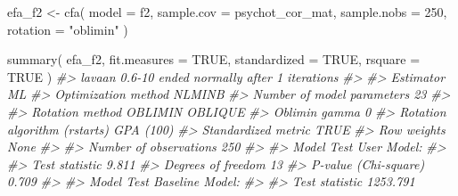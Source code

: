 \documentclass[
  11pt,
]{krantz}
\makeatletter
\newenvironment{Shaded}{\begin{snugshade}}{\end{snugshade}}
\newcommand{\AttributeTok}[1]{\textcolor[rgb]{0.61,0.61,0.61}{#1}}
\newcommand{\CommentTok}[1]{\textcolor[rgb]{0.37,0.37,0.37}{\textit{#1}}}
\newcommand{\ConstantTok}[1]{\textcolor[rgb]{0,0,0}{#1}}
\newcommand{\DecValTok}[1]{\textcolor[rgb]{0.06,0.06,0.06}{#1}}
\newcommand{\FunctionTok}[1]{\textcolor[rgb]{0,0,0}{#1}}
\newcommand{\NormalTok}[1]{#1}
\newcommand{\OtherTok}[1]{\textcolor[rgb]{0.37,0.37,0.37}{#1}}
\newcommand{\StringTok}[1]{\textcolor[rgb]{0.5,0.5,0.5}{#1}}
\newenvironment{kframe}{%
\medskip{}
\setlength{\fboxsep}{.8em}
 \def\at@end@of@kframe{}%
 \ifinner\ifhmode%
  \def\at@end@of@kframe{\end{minipage}}%
  \begin{minipage}{\columnwidth}%
 \fi\fi%
 \def\FrameCommand##1{\hskip\@totalleftmargin \hskip-\fboxsep
 \colorbox{shadecolor}{##1}\hskip-\fboxsep
     \hskip-\linewidth \hskip-\@totalleftmargin \hskip\columnwidth}%
 \MakeFramed {\advance\hsize-\width
   \@totalleftmargin\z@ \linewidth\hsize
   \@setminipage}}%
 {\par\unskip\endMakeFramed%
 \at@end@of@kframe}
\renewenvironment{Shaded}{\begin{kframe}}{\end{kframe}}
\theoremstyle{definition}
\theoremstyle{definition}
\theoremstyle{definition}
\theoremstyle{definition}
\theoremstyle{remark}
\makeatother
\begin{document}
\begin{Shaded}
\begin{Highlighting}[]
\NormalTok{efa\_f2 }\OtherTok{\textless{}{-}}
  \FunctionTok{cfa}\NormalTok{(}
    \AttributeTok{model =}\NormalTok{ f2,}
    \AttributeTok{sample.cov =}\NormalTok{ psychot\_cor\_mat,}
    \AttributeTok{sample.nobs =} \DecValTok{250}\NormalTok{,}
    \AttributeTok{rotation =} \StringTok{"oblimin"}
\NormalTok{  )}
\end{Highlighting}
\end{Shaded}

\begin{Shaded}
\begin{Highlighting}[]
\FunctionTok{summary}\NormalTok{(}
\NormalTok{  efa\_f2,}
  \AttributeTok{fit.measures =} \ConstantTok{TRUE}\NormalTok{,}
  \AttributeTok{standardized =} \ConstantTok{TRUE}\NormalTok{,}
  \AttributeTok{rsquare =} \ConstantTok{TRUE}
\NormalTok{)}
\CommentTok{\#\textgreater{} lavaan 0.6{-}10 ended normally after 1 iterations}
\CommentTok{\#\textgreater{} }
\CommentTok{\#\textgreater{}   Estimator                                         ML}
\CommentTok{\#\textgreater{}   Optimization method                           NLMINB}
\CommentTok{\#\textgreater{}   Number of model parameters                        23}
\CommentTok{\#\textgreater{}                                                       }
\CommentTok{\#\textgreater{}   Rotation method                      OBLIMIN OBLIQUE}
\CommentTok{\#\textgreater{}   Oblimin gamma                                      0}
\CommentTok{\#\textgreater{}   Rotation algorithm (rstarts)               GPA (100)}
\CommentTok{\#\textgreater{}   Standardized metric                             TRUE}
\CommentTok{\#\textgreater{}   Row weights                                     None}
\CommentTok{\#\textgreater{}                                                       }
\CommentTok{\#\textgreater{}   Number of observations                           250}
\CommentTok{\#\textgreater{}                                                       }
\CommentTok{\#\textgreater{} Model Test User Model:}
\CommentTok{\#\textgreater{}                                                       }
\CommentTok{\#\textgreater{}   Test statistic                                 9.811}
\CommentTok{\#\textgreater{}   Degrees of freedom                                13}
\CommentTok{\#\textgreater{}   P{-}value (Chi{-}square)                           0.709}
\CommentTok{\#\textgreater{} }
\CommentTok{\#\textgreater{} Model Test Baseline Model:}
\CommentTok{\#\textgreater{} }
\CommentTok{\#\textgreater{}   Test statistic                              1253.791}

\end{Highlighting}
\end{Shaded}
\end{document}
